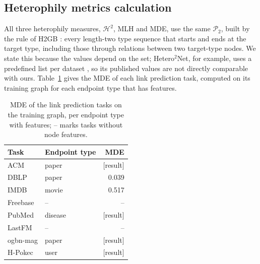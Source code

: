 \documentclass{article}
\newcommand{\res}{{\scriptsize[result]}}
\begin{document}
\subsection{Heterophily metrics calculation}
All three heterophily measures, $\mathcal{H}^2$, MLH and MDE, use the same $\mathcal{P}_2$, built by the rule of H2GB \cite{lin2025heterophily}: every length-two type sequence that starts and ends at the target type, including those through relations between two target-type nodes. We state this because the values depend on the set; Hetero$^2$Net, for example, uses a predefined list per dataset \cite{li2025hetero2net}, so its published values are not directly comparable with ours.
Table~\ref{tab:app-lp-mde} gives the MDE of each link prediction task, computed on its training graph for each endpoint type that has features.

\begin{table}[!htbp]
  \centering
  \caption{MDE of the link prediction tasks on the training graph, per endpoint type with features; -- marks tasks without node features.}
  \label{tab:app-lp-mde}
  \scriptsize
  \setlength{\tabcolsep}{3pt}
  \begin{tabular}{llr}
    \toprule
    Task & Endpoint type & MDE \\
    \midrule
    ACM & paper & \res \\
    DBLP & paper & 0.039 \\
    IMDB & movie & 0.517 \\
    Freebase & -- & -- \\
    PubMed & disease & \res \\
    LastFM & -- & -- \\
    ogbn-mag & paper & \res \\
    H-Pokec & user & \res \\
    \bottomrule
  \end{tabular}
\end{table}
\end{document}
